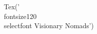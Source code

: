 \documentclass[preview]{standalone}
\begin{document}
\begin{center}
Tex('\\fontsize{12}{0}\\selectfont Visionary Nomads')
\end{center}
\end{document}

